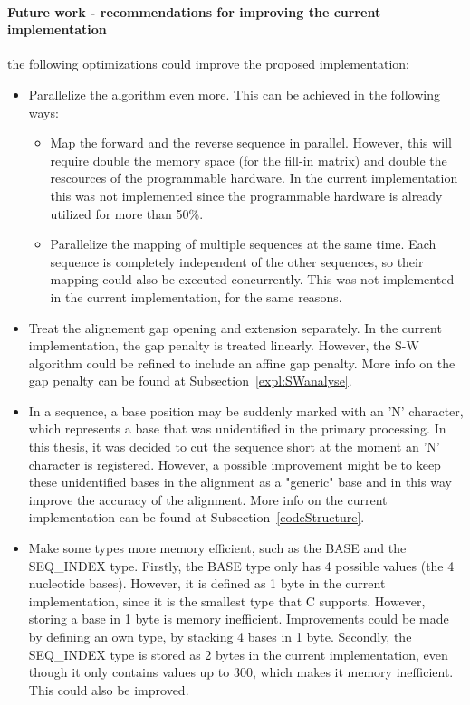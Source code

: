 \paragraph{Future work - recommendations for improving the current implementation}

the following optimizations could improve the proposed implementation:

\begin{itemize}
	\item Parallelize the algorithm even more. This can be achieved in the following ways:
	\begin{itemize}
		\item Map the forward and the reverse sequence in parallel. However, this will require double the memory space (for the fill-in matrix) and double the rescources of the programmable hardware. In the current implementation this was not implemented since the programmable hardware is already utilized for more than 50\%.
		\item Parallelize the mapping of multiple sequences at the same time. Each sequence is completely independent of the other sequences, so their mapping could also be executed concurrently. This was not implemented in the current implementation, for the same reasons.
	\end{itemize}
	
	\item Treat the alignement gap opening and extension separately. In the current implementation, the gap penalty is treated linearly. However, the S-W algorithm could be refined to include an affine gap penalty. More info on the gap penalty can be found at Subsection~\ref{expl:SWanalyse}.
	
	\item In a sequence, a base position may be suddenly marked with an 'N' character, which represents a base that was unidentified in the primary processing. In this thesis, it was decided to cut the sequence short at the moment an 'N' character is registered. However, a possible improvement might be to keep these unidentified bases in the alignment as a "generic" base and in this way improve the accuracy of the alignment. More info on the current implementation can be found at Subsection~\ref{codeStructure}.
	
	\item Make some types more memory efficient, such as the BASE and the SEQ\_INDEX type. Firstly, the BASE type only has 4 possible values (the 4 nucleotide bases). However, it is defined as 1 byte in the current implementation, since it is the smallest type that C supports. However, storing a base in 1 byte is memory inefficient. Improvements could be made by defining an own type, by stacking 4 bases in 1 byte. Secondly, the SEQ\_INDEX type is stored as 2 bytes in the current implementation, even though it only contains values up to 300, which makes it memory inefficient. This could also be improved.
	

\end{itemize}
